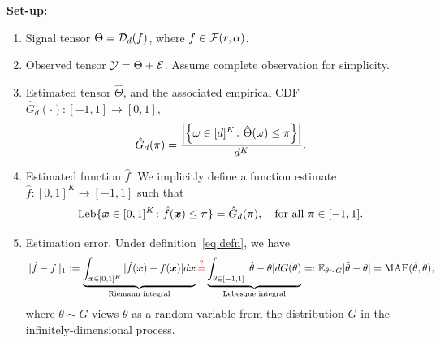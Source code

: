 \documentclass[10pt]{article}
\newcommand*{\KeepStyleUnderBrace}[1]{%
  \mathop{%
    \mathchoice
    {\underbrace{\displaystyle#1}}%
    {\underbrace{\textstyle#1}}%
    {\underbrace{\scriptstyle#1}}%
    {\underbrace{\scriptscriptstyle#1}}%
  }\limits
}
\theoremstyle{definition}
\theoremstyle{definition}
\theoremstyle{definition}
\begin{document}
{\bf Set-up:} 
\begin{enumerate}
\item Signal tensor $\Theta=\mathcal{D}_d(f)$, where $f\in\mathcal{F}(r,\alpha)$. 
\item Observed tensor $\mathcal{Y}=\Theta+\mathcal{E}$. Assume complete observation for simplicity. 
\item Estimated tensor $\hat \Theta$, and the associated empirical CDF $\hat G_d(\cdot)\colon [-1,1]\to[0,1]$,
\[
\hat G_d(\pi)={\left|\left\{ \omega\in[d]^K \colon \hat \Theta(\omega)\leq \pi \right\}\right| \over d^K}.
\]
\item Estimated function $\hat f$. We implicitly define a function estimate $\hat f\colon[0,1]^K\to[-1,1]$ such that
\begin{equation}\label{eq:defn}
\text{Leb}\{\bm x\in[0,1]^K\colon \hat f(\bm x)\leq \pi\} = \hat G_d(\pi), \quad \text{for all }\pi\in[-1,1].
\end{equation}
\item Estimation error.  Under definition~\eqref{eq:defn}, we have
\begin{equation}\label{eq:loss}
\onenormSize{}{\hat f - f}:=\KeepStyleUnderBrace{\int_{\mx\in[0,1]^K} |\hat f(\mx)-f(\mx)| d\mx}_{\text{Riemann integral}} {\stackrel{\color{red}{?}}=} \KeepStyleUnderBrace{\int_{\theta\in[-1,1]} |\hat \theta-\theta|dG(\theta)}_{\text{Lebesque integral}}=:\mathbb{E}_{\theta\sim G}|\hat \theta-\theta| = \text{MAE}(\hat\theta, \theta),
\end{equation}
where $\theta\sim G$ views $\theta$ as a random variable from the distribution $G$ in the infinitely-dimensional process. \\


\end{enumerate}
\end{document}
